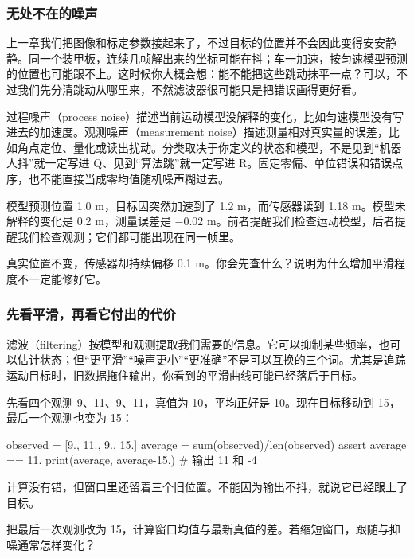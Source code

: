 \subsubsection{无处不在的噪声}
上一章我们把图像和标定参数接起来了，不过目标的位置并不会因此变得安安静静。同一个装甲板，连续几帧解出来的坐标可能在抖；车一加速，按匀速模型预测的位置也可能跟不上。这时候你大概会想：能不能把这些跳动抹平一点？可以，不过我们先分清跳动从哪里来，不然滤波器很可能只是把错误画得更好看。

过程噪声（process noise）描述当前运动模型没解释的变化，比如匀速模型没有写进去的加速度。观测噪声（measurement noise）描述测量相对真实量的误差，比如角点定位、量化或读出扰动。分类取决于你定义的状态和模型，不是见到“机器人抖”就一定写进 Q、见到“算法跳”就一定写进 R。固定零偏、单位错误和错误点序，也不能直接当成零均值随机噪声糊过去。

\begin{example}[先把两种误差拆开]
模型预测位置 1.0 m，目标因突然加速到了 1.2 m，而传感器读到 1.18 m。模型未解释的变化是 0.2 m，测量误差是 $-0.02$ m。前者提醒我们检查运动模型，后者提醒我们检查观测；它们都可能出现在同一帧里。
\end{example}
\begin{exercise}\label{ex:v2-filter-bias}
真实位置不变，传感器却持续偏移 0.1 m。你会先查什么？说明为什么增加平滑程度不一定能修好它。
\end{exercise}

\subsubsection{先看平滑，再看它付出的代价}
滤波（filtering）按模型和观测提取我们需要的信息。它可以抑制某些频率，也可以估计状态；但“更平滑”“噪声更小”“更准确”不是可以互换的三个词。尤其是追踪运动目标时，旧数据拖住输出，你看到的平滑曲线可能已经落后于目标。

\begin{example}
先看四个观测 9、11、9、11，真值为 10，平均正好是 10。现在目标移动到 15，最后一个观测也变为 15：
\begin{tpython}
observed = [9., 11., 9., 15.]
average = sum(observed)/len(observed)
assert average == 11.
print(average, average-15.)  # 输出 11 和 -4
\end{tpython}
计算没有错，但窗口里还留着三个旧位置。不能因为输出不抖，就说它已经跟上了目标。
\end{example}
\begin{exercise}\label{ex:v2-filter-window}
把最后一次观测改为 15，计算窗口均值与最新真值的差。若缩短窗口，跟随与抑噪通常怎样变化？
\end{exercise}

